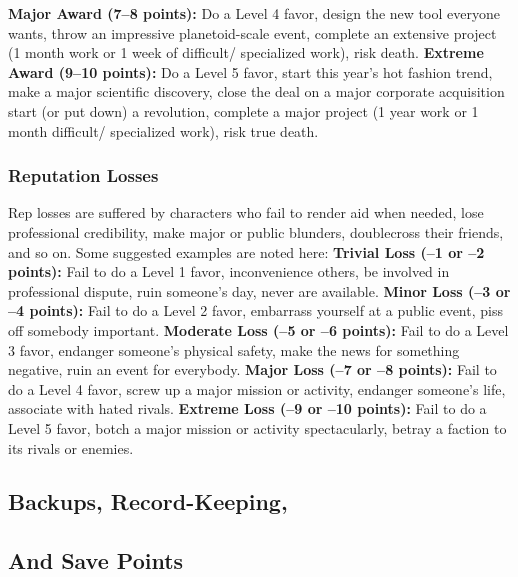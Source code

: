 \textbf{Major Award (7–8 points):} Do a Level 4 favor, 
design the new tool everyone wants, throw an 
impressive planetoid-scale event, complete an extensive
project (1 month work or 1 week of difficult/
specialized work), risk death.
\textbf{Extreme Award (9–10 points):} Do a Level 5 favor, 
start this year's hot fashion trend, make a major scientific
discovery, close the deal on a major corporate acquisition
start (or put down) a revolution, complete
a major project (1 year work or 1 month difficult/
specialized work), risk true death.

\subsubsection{Reputation Losses}

Rep losses are suffered by characters who fail to render 
aid when needed, lose professional credibility, make 
major or public blunders, doublecross their friends, 
and so on. Some suggested examples are noted here:
\textbf{Trivial Loss (–1 or –2 points):} Fail to do a Level 1 
favor, inconvenience others, be involved in professional
dispute, ruin someone's day, never are available.
\textbf{Minor Loss (–3 or –4 points):} Fail to do a Level 2 
favor, embarrass yourself at a public event, piss off 
somebody important.
\textbf{Moderate Loss (–5 or –6 points):} Fail to do a Level 
3 favor, endanger someone's physical safety, make 
the news for something negative, ruin an event for 
everybody.
\textbf{Major Loss (–7 or –8 points):} Fail to do a Level 4 
favor, screw up a major mission or activity, endanger 
someone's life, associate with hated rivals.
\textbf{Extreme Loss (–9 or –10 points):} Fail to do a Level 
5 favor, botch a major mission or activity spectacularly, 
betray a faction to its rivals or enemies.

\subsection{Backups, Record-Keeping,}


\subsection{And Save Points}

